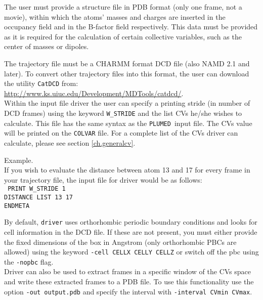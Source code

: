 \documentclass[12pt,fleqn]{report}
\newcommand{\plumed}{{\tt PLUMED}}
\newcommand{\esempio}[1]{
\vspace{10pt}
\begin{flushright}
\colorbox{light-gray}{
   \begin{minipage}{13cm}
       \scriptsize{
{\fontfamily{phv} \fontseries{b}
 \selectfont Example. \\
 \fontseries{m} \selectfont #1 } }
\end{minipage}}
\end{flushright}
\vspace{20pt}
}
\begin{document}
The user must provide a structure file in PDB format (only one frame, not a movie), within which the 
 atoms' masses and charges are inserted in the 
occupancy field and in the B-factor field respectively.
This data must be provided as it is required for the calculation of certain collective variables, such as
the center of masses or dipoles.

The trajectory file must be a CHARMM format DCD file (also NAMD 2.1 and later). 
To convert other trajectory files into this format, the user can download the utility {\tt CatDCD} from: \\ \url{http://www.ks.uiuc.edu/Development/MDTools/catdcd/}.\\

Within the input file driver the user can specify a printing stride (in number of DCD frames) using
the keyword {\tt W\_STRIDE} and the list CVs he/she wishes to calculate.  This file has the same syntax as the \plumed \ input file.
The CVs value will be printed on the {\tt COLVAR} file.
For a complete list of the CVs driver can calculate, please see section \ref{ch.generalcv}.

\esempio{If you wish to evaluate the distance between atom 13 and 17
for every frame in your trajectory file, the input file for driver would be as follows:
 \vspace{10pt} \\ 
{\tt
PRINT W\_STRIDE 1\\
DISTANCE LIST 13 17\\
ENDMETA
}}

By default, {\tt driver} uses orthorhombic periodic boundary conditions and looks for cell information in the DCD file. 
If these are not present, you must either provide the fixed dimensions of the box in Angstrom (only orthorhombic PBCs are allowed)
using the keyword {\tt -cell CELLX CELLY CELLZ} or switch off the pbc using the {\tt -nopbc} flag.
\\
Driver can also be used to extract frames in a specific window of the CVs space and write these extracted frames to a PDB file.
To use this functionality use the option {\tt -out output.pdb} and specify the interval with {\tt -interval CVmin CVmax}.
\end{document}
